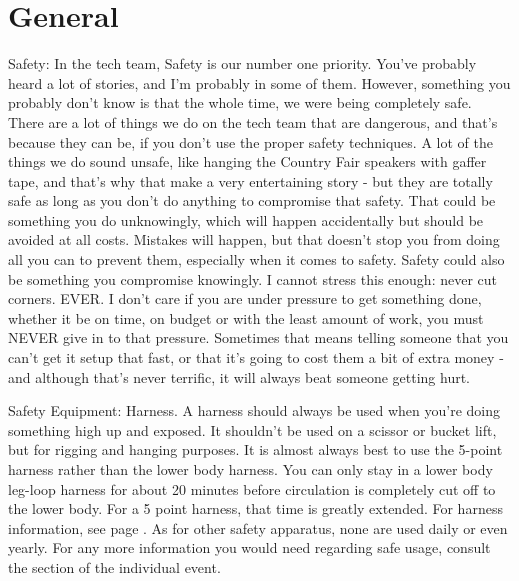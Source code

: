 \documentclass[11pt,a4paper]{book}
\begin{document}
\chapter{General}
Safety: In the tech team, Safety is our number one priority. You've probably heard a lot of stories, and I'm probably in some of them. However, something you probably don't know is that the whole time, we were being completely safe. There are a lot of things we do on the tech team that are dangerous, and that's because they can be, if you don't use the proper safety techniques. A lot of the things we do sound unsafe, like hanging the Country Fair speakers with gaffer tape, and that's why that make a very entertaining story - but they are totally safe as long as you don't do anything to compromise that safety. That could be something you do unknowingly, which will happen accidentally but should be avoided at all costs. Mistakes will happen, but that doesn't stop you from doing all you can to prevent them, especially when it comes to safety. Safety could also be something you compromise knowingly. I cannot stress this enough: never cut corners. EVER. I don't care if you are under pressure to get something done, whether it be on time, on budget or with the least amount of work, you must NEVER give in to that pressure. Sometimes that means telling someone that you can't get it setup that fast, or that it's going to cost them a bit of extra money - and although that's never terrific, it will always beat someone getting hurt.

Safety Equipment: Harness. A harness should always be used when you're doing something high up and exposed. It shouldn't be used on a scissor or bucket lift, but for rigging and hanging purposes. It is almost always best to use the 5-point harness rather than the lower body harness. You can only stay in a lower body leg-loop harness for about 20 minutes before circulation is completely cut off to the lower body. For a 5 point harness, that time is greatly extended. For harness information, see page . As for other safety apparatus, none are used daily or even yearly. For any more information you would need regarding safe usage, consult the section of the individual event.
\end{document}
